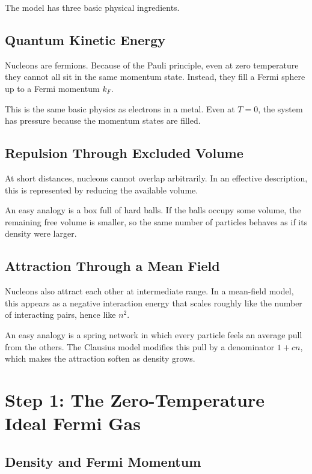 \documentclass[11pt]{article}
\begin{document}
The model has three basic physical ingredients.

\subsection{Quantum Kinetic Energy}

Nucleons are fermions. Because of the Pauli principle, even at zero
temperature they cannot all sit in the same momentum state. Instead, they fill
a Fermi sphere up to a Fermi momentum $k_F$.

This is the same basic physics as electrons in a metal. Even at $T=0$, the
system has pressure because the momentum states are filled.

\subsection{Repulsion Through Excluded Volume}

At short distances, nucleons cannot overlap arbitrarily. In an effective
description, this is represented by reducing the available volume.

An easy analogy is a box full of hard balls. If the balls occupy some volume,
the remaining free volume is smaller, so the same number of particles behaves
as if its density were larger.

\subsection{Attraction Through a Mean Field}

Nucleons also attract each other at intermediate range. In a mean-field model,
this appears as a negative interaction energy that scales roughly like the
number of interacting pairs, hence like $n^2$.

An easy analogy is a spring network in which every particle feels an average
pull from the others. The Clausius model modifies this pull by a denominator
$1+cn$, which makes the attraction soften as density grows.

\section{Step 1: The Zero-Temperature Ideal Fermi Gas}

\subsection{Density and Fermi Momentum}
\end{document}
